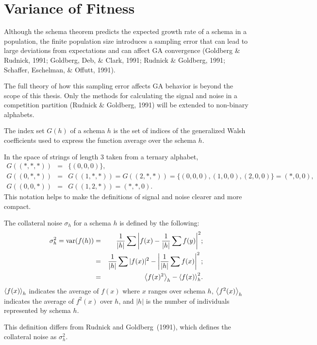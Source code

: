 \typeout{}

\chapter{Variance of Fitness}
Although the schema theorem predicts the expected growth rate of a schema
in a population, the finite population size introduces a sampling error
that can lead to large deviations from expectations and can affect GA
convergence 
(Goldberg \& Rudnick, 1991; 
Goldberg, Deb, \& Clark, 1991; 
Rudnick \& Goldberg, 1991; 
Schaffer, Eschelman, \& Offutt, 1991).

The full theory of how this sampling error affects GA behavior is beyond
the scope of this thesis.  Only the methods for calculating the signal
and noise in a competition partition (Rudnick \& Goldberg, 1991) will be
extended to non-binary alphabets.

\begin{definition}
The index set $G(h)$ of a schema $h$ is the set of indices of the
generalized Walsh coefficients used to express the function average
over the schema $h$.
\end{definition}
\begin{example}
In the space of strings of length 3 taken from a ternary alphabet,
\begin{eqnarray}
G((*,*,*))&=&\{(0,0,0)\},
	\nonumber\\
G((0,*,*))&=&G((1,*,*))=G((2,*,*))=\{(0,0,0),(1,0,0),(2,0,0)\}=(*,0,0),
	\nonumber\\
G((0,0,*))&=&G((1,2,*))=(*,*,0).
\end{eqnarray}
This notation helps to make the definitions of signal and noise clearer
and more compact.

\end{example}

\begin{definition}
The collateral noise $\sigma_h$ for a schema $h$ is defined by the
following:
\begin{eqnarray}
\sigma_h^2=\mbox{\rm var}(f(h))&=&\frac{1}{|h|} \sum{\left|f(x)-\frac{1}{|h|}
	\sum{f(y)}\right|^2};\nonumber\\
&=& \frac{1}{|h|} \sum{|f(x)|^2} -\left|\frac{1}{|h|} \sum{f(x)}\right|^2;
	\nonumber\\
&=& {\left\langle f(x)^2 \right\rangle}_h-{\left\langle f(x) \right\rangle}_h^2.
	\label{collat}
\end{eqnarray}
${\left\langle f(x) \right\rangle}_h$ indicates the average of $f(x)$ where
$x$ ranges over schema $h$, ${\left\langle f^2(x) \right\rangle}_h$ indicates the
average of $f^2(x)$ over $h$,
and $|h|$ is the number of individuals represented by schema $h$.
\end{definition}
This definition differs from Rudnick and Goldberg~(1991), which defines
the collateral noise as $\sigma_h^2$.


